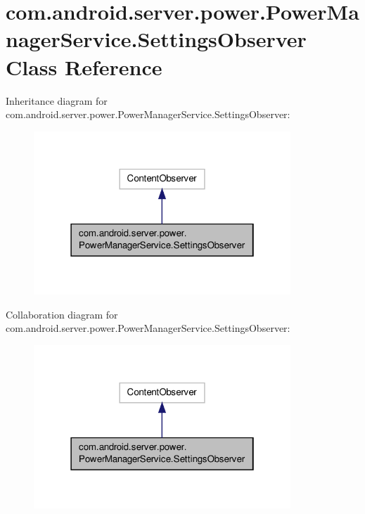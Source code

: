\hypertarget{classcom_1_1android_1_1server_1_1power_1_1PowerManagerService_1_1SettingsObserver}{\section{com.\-android.\-server.\-power.\-Power\-Manager\-Service.\-Settings\-Observer Class Reference}
\label{classcom_1_1android_1_1server_1_1power_1_1PowerManagerService_1_1SettingsObserver}
}


Inheritance diagram for com.\-android.\-server.\-power.\-Power\-Manager\-Service.\-Settings\-Observer\-:
\nopagebreak
\begin{figure}[H]
\begin{center}
\leavevmode
\includegraphics[width=274pt]{classcom_1_1android_1_1server_1_1power_1_1PowerManagerService_1_1SettingsObserver__inherit__graph}
\end{center}
\end{figure}


Collaboration diagram for com.\-android.\-server.\-power.\-Power\-Manager\-Service.\-Settings\-Observer\-:
\nopagebreak
\begin{figure}[H]
\begin{center}
\leavevmode
\includegraphics[width=274pt]{classcom_1_1android_1_1server_1_1power_1_1PowerManagerService_1_1SettingsObserver__coll__graph}
\end{center}
\end{figure}
